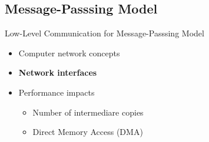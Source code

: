 	\subsection{Message-Passsing Model}

		\begin{frame}[fragile]{Low-Level Communication for Message-Passsing Model}
			\begin{itemize}
				\item Computer network concepts
				\item \textbf{Network interfaces}
				\item Performance impacts
				\begin{itemize}
					\item Number of intermediare copies
					\item Direct Memory Access (DMA)
				\end{itemize}
			\end{itemize}

		\end{frame}

